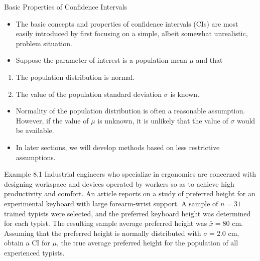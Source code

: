 \documentclass[
  ignorenonframetext,
]{beamer}
\providecommand{\tightlist}{%
  \setlength{\itemsep}{0pt}\setlength{\parskip}{0pt}}\usepackage{longtable,booktabs,array}
\begin{document}
\begin{frame}{Basic Properties of Confidence Intervals}
\protect\hypertarget{basic-properties-of-confidence-intervals-1}{}
\begin{itemize}[<+->]
\tightlist
\item
  The basic concepts and properties of confidence intervals (CIs) are
  most easily introduced by first focusing on a simple, albeit somewhat
  unrealistic, problem situation.
\item
  Suppose the parameter of interest is a population mean \(\mu\) and
  that
\end{itemize}

\begin{enumerate}[<+->]
\tightlist
\item
  The population distribution is normal.
\item
  The value of the population standard deviation \(\sigma\) is known.
\end{enumerate}

\begin{itemize}[<+->]
\tightlist
\item
  Normality of the population distribution is often a reasonable
  assumption. However, if the value of \(\mu\) is unknown, it is
  unlikely that the value of \(\sigma\) would be available.
\item
  In later sections, we will develop methods based on less restrictive
  assumptions.
\end{itemize}
\end{frame}

\begin{frame}{Example 8.1}
\protect\hypertarget{example-8.1}{}
Industrial engineers who specialize in ergonomics are concerned with
designing workspace and devices operated by workers so as to achieve
high productivity and comfort. An article reports on a study of
preferred height for an experimental keyboard with large forearm-wrist
support. A sample of \(n=31\) trained typists were selected, and the
preferred keyboard height was determined for each typist. The resulting
sample average preferred height was \(\bar{x} = 80\) cm. Assuming that
the preferred height is normally distributed with \(\sigma = 2.0\) cm,
obtain a CI for \(\mu\), the true average preferred height for the
population of all experienced typists.
\end{frame}
\end{document}
